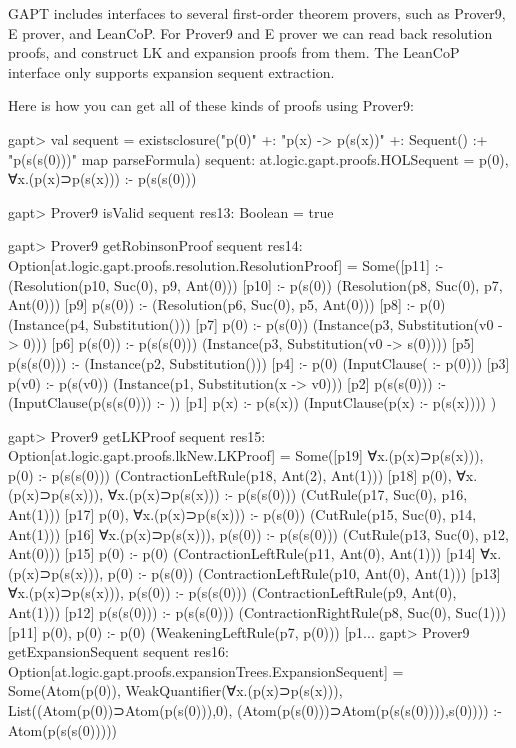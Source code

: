 \documentclass[a4paper,11pt]{article}
\begin{document}
GAPT includes interfaces to several first-order theorem provers, such as
Prover9, E prover, and LeanCoP.  For Prover9 and E prover we can read back
resolution proofs, and construct LK and expansion proofs from them.  The
LeanCoP interface only supports expansion sequent extraction.

Here is how you can get all of these kinds of proofs using Prover9:
\begin{clilisting}
gapt> val sequent = existsclosure("p(0)" +: "p(x) -> p(s(x))" +: Sequent() :+ "p(s(s(0)))" map parseFormula)
sequent: at.logic.gapt.proofs.HOLSequent = p(0), ∀x.(p(x)⊃p(s(x))) :- p(s(s(0)))

gapt> Prover9 isValid sequent
res13: Boolean = true

gapt> Prover9 getRobinsonProof sequent
res14: Option[at.logic.gapt.proofs.resolution.ResolutionProof] =
Some([p11]  :-     (Resolution(p10, Suc(0), p9, Ant(0)))
[p10]  :- p(s(0))    (Resolution(p8, Suc(0), p7, Ant(0)))
[p9] p(s(0)) :-     (Resolution(p6, Suc(0), p5, Ant(0)))
[p8]  :- p(0)    (Instance(p4, Substitution()))
[p7] p(0) :- p(s(0))    (Instance(p3, Substitution(v0 -> 0)))
[p6] p(s(0)) :- p(s(s(0)))    (Instance(p3, Substitution(v0 -> s(0))))
[p5] p(s(s(0))) :-     (Instance(p2, Substitution()))
[p4]  :- p(0)    (InputClause( :- p(0)))
[p3] p(v0) :- p(s(v0))    (Instance(p1, Substitution(x -> v0)))
[p2] p(s(s(0))) :-     (InputClause(p(s(s(0))) :- ))
[p1] p(x) :- p(s(x))    (InputClause(p(x) :- p(s(x))))
)

gapt> Prover9 getLKProof sequent
res15: Option[at.logic.gapt.proofs.lkNew.LKProof] =
Some([p19] ∀x.(p(x)⊃p(s(x))), p(0) :- p(s(s(0)))    (ContractionLeftRule(p18, Ant(2), Ant(1)))
[p18] p(0), ∀x.(p(x)⊃p(s(x))), ∀x.(p(x)⊃p(s(x))) :- p(s(s(0)))    (CutRule(p17, Suc(0), p16, Ant(1)))
[p17] p(0), ∀x.(p(x)⊃p(s(x))) :- p(s(0))    (CutRule(p15, Suc(0), p14, Ant(1)))
[p16] ∀x.(p(x)⊃p(s(x))), p(s(0)) :- p(s(s(0)))    (CutRule(p13, Suc(0), p12, Ant(0)))
[p15] p(0) :- p(0)    (ContractionLeftRule(p11, Ant(0), Ant(1)))
[p14] ∀x.(p(x)⊃p(s(x))), p(0) :- p(s(0))    (ContractionLeftRule(p10, Ant(0), Ant(1)))
[p13] ∀x.(p(x)⊃p(s(x))), p(s(0)) :- p(s(s(0)))    (ContractionLeftRule(p9, Ant(0), Ant(1)))
[p12] p(s(s(0))) :- p(s(s(0)))    (ContractionRightRule(p8, Suc(0), Suc(1)))
[p11] p(0), p(0) :- p(0)    (WeakeningLeftRule(p7, p(0)))
[p1...
gapt> Prover9 getExpansionSequent sequent
res16: Option[at.logic.gapt.proofs.expansionTrees.ExpansionSequent] = Some(Atom(p(0)), WeakQuantifier(∀x.(p(x)⊃p(s(x))), List((Atom(p(0))⊃Atom(p(s(0))),0), (Atom(p(s(0)))⊃Atom(p(s(s(0)))),s(0)))) :- Atom(p(s(s(0)))))

\end{clilisting}
\end{document}
